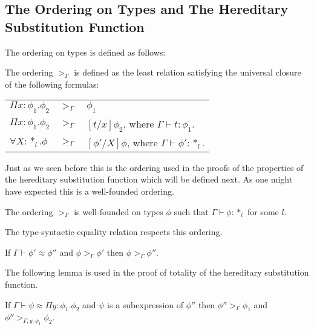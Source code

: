 \subsection{The Ordering on Types and The Hereditary Substitution Function}
\label{sec:the_hereditary_substitution_function_ssfe}
The ordering on types is defined as follows:
\begin{definition}
  The ordering $>_\Gamma$ is defined as the least relation satisfying the universal closure
  of the following formulas:
  \begin{center}
    \begin{tabular}{lll}
      $\Pi x:\phi_1.\phi_2$ & $>_\Gamma$ & $\phi_1$\\
      $\Pi x:\phi_1.\phi_2$ & $>_{\Gamma}$ & $[t/x]\phi_2$, where $\Gamma \vdash t:\phi_1$.\\
      $\forall X:*_l.\phi$  & $>_\Gamma$ & $[\phi'/X]\phi$, where $\Gamma \vdash \phi':*_l$.\\
    \end{tabular}
  \end{center}
  \label{def:ordering_ssfe}
\end{definition}
Just as we seen before this is the ordering used in the proofs of the
properties of the hereditary substitution function which will be
defined next.  As one might have expected this is a well-founded
ordering.
\begin{thm}
  The ordering $>_\Gamma$ is well-founded on types $\phi$ such that 
  $\Gamma \vdash \phi:*_l$ for some $l$.
  \label{thm:well-founded_ordering_ssfe}
\end{thm}
The type-syntactic-equality relation respects this ordering.
\begin{lemma}[]
  \label{lemma:typeq_ordering_ssfe}
  If $\Gamma \vdash \phi' \approx \phi''$ and $\phi >_{\Gamma} \phi'$ then $\phi >_\Gamma \phi''$.
\end{lemma}
The following lemma is used in the proof of totality of the hereditary substitution function.
\begin{lemma}[]
  \label{lemma:A_prop_ssfe}
  If $\Gamma \vdash \psi \approx \Pi y:\phi_1.\phi_2$ and $\psi$ is a subexpression of $\phi''$ then
  $\phi'' >_\Gamma \phi_1$ and $\phi'' >_{\Gamma,y:\phi_1} \phi_2$.
\end{lemma}


